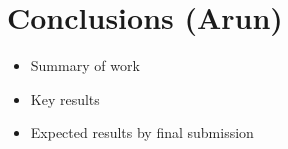 \section{Conclusions (Arun)}
\label{sec:conclusions}
\begin{itemize}
    \item Summary of work
    \item Key results
    \item Expected results by final submission
\end{itemize}
